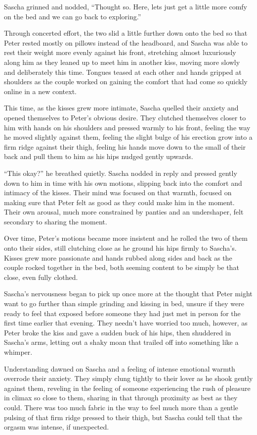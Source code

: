Sascha grinned and nodded, ``Thought so. Here, lets just get a little more comfy on the bed and we can go back to exploring.''

Through concerted effort, the two slid a little further down onto the bed so that Peter rested mostly on pillows instead of the headboard, and Sascha was able to rest their weight more evenly against his front, stretching almost luxuriously along him as they leaned up to meet him in another kiss, moving more slowly and deliberately this time. Tongues teased at each other and hands gripped at shoulders as the couple worked on gaining the comfort that had come so quickly online in a new context.

This time, as the kisses grew more intimate, Sascha quelled their anxiety and opened themselves to Peter's obvious desire. They clutched themselves closer to him with hands on his shoulders and pressed warmly to his front, feeling the way he moved slightly against them, feeling the slight bulge of his erection grow into a firm ridge against their thigh, feeling his hands move down to the small of their back and pull them to him as his hips nudged gently upwards.

``This okay?'' he breathed quietly. Sascha nodded in reply and pressed gently down to him in time with his own motions, slipping back into the comfort and intimacy of the kisses. Their mind was focused on that warmth, focused on making sure that Peter felt as good as they could make him in the moment. Their own arousal, much more constrained by panties and an undershaper, felt secondary to sharing the moment.

Over time, Peter's motions became more insistent and he rolled the two of them onto their sides, still clutching close as he ground his hips firmly to Sascha's. Kisses grew more passionate and hands rubbed along sides and back as the couple rocked together in the bed, both seeming content to be simply be that close, even fully clothed.

Sascha's nervousness began to pick up once more at the thought that Peter might want to go further than simple grinding and kissing in bed, unsure if they were ready to feel that exposed before someone they had just met in person for the first time earlier that evening. They needn't have worried too much, however, as Peter broke the kiss and gave a sudden buck of his hips, then shuddered in Sascha's arms, letting out a shaky moan that trailed off into something like a whimper.

Understanding dawned on Sascha and a feeling of intense emotional warmth overrode their anxiety. They simply clung tightly to their lover as he shook gently against them, reveling in the feeling of someone experiencing the rush of pleasure in climax so close to them, sharing in that through proximity as best as they could. There was too much fabric in the way to feel much more than a gentle pulsing of that firm ridge pressed to their thigh, but Sascha could tell that the orgasm was intense, if unexpected.

